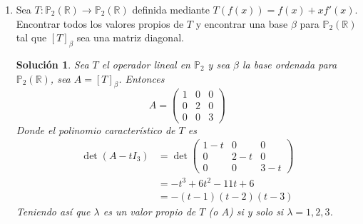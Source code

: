 \documentclass[letterpaper]{article}
\newcommand{\R}{\mathbb{R}}
\newcommand{\Po}{\mathds{P}}
\newtheorem*{sol}{Solución}
\begin{document}
\begin{enumerate}
\begin{enumerate}[label=(\alph*)]
\begin{proof}
\begin{itemize}
        \item[$(\supseteq)$] Sea $x \in N(T)$. Para cualquier $y \in V$, se tiene que
        $0 = \langle 0, y \rangle = \langle T(x), y \rangle = \langle x, T^*(y) \rangle$. Por tanto $x \in R(T^*)^\bot$.
    \end{itemize}
    \end{proof}
    
    \item Si $V$ es dimensionalmente finito, entonces $R(T^*) = N(T)^\bot$.
    \begin{proof}\hfill
    \begin{itemize}
        \item[$(\subseteq)$] Sea $x \in N(T)$, entonces hay un $y \in W$ y $z \in W^\bot$ tales que $x = y+z$.
        De ahí que $0 = T(x) = y$, entonces $x = x \in W^\bot$. 

        \item[$(\supseteq)$] Sea $x \in W^\bot$, de ahí que $T(x) = 0$, entonces $x \in N(T)$.
    \end{itemize}
    \end{proof}
\end{enumerate}

\item Sea $T : \Po_2(\R) \to \Po_2(\R)$ definida mediante $T(f(x)) = f(x) + xf'(x)$. Encontrar todos los valores
propios de $T$ y encontrar una base $\beta$ para $\Po_2(\R)$ tal que $[T]_\beta$ sea una matriz diagonal.

\begin{sol}
Sea $T$ el operador lineal en $\Po_2$ y sea $\beta$ la base ordenada para $\Po_2(\R)$, sea $A = [T]_\beta$. Entonces
\[
    A =
    \begin{pmatrix}
        1 & 0 & 0\\
        0 & 2 & 0\\
        0 & 0 & 3
    \end{pmatrix}
\]
Donde el polinomio característico de $T$ es
\begin{align*}
    \det(A - tI_3)
        &= \det
            \begin{pmatrix}
                1-t & 0   & 0\\
                0   & 2-t & 0\\
                0   & 0   & 3-t
            \end{pmatrix}\\
        &= -t^3 + 6t^2 - 11t + 6\\
        &= -(t-1)(t-2)(t-3)
\end{align*}
Teniendo así que $\lambda$ es un valor propio de $T$ (o $A$) si y solo si $\lambda = 1,2,3$.


\end{sol}
\end{enumerate}
\end{document}
